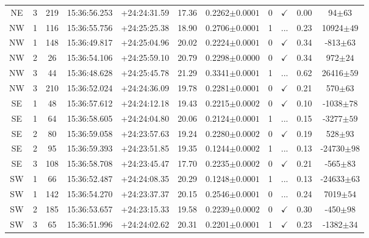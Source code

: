 \begin{table*}
\begin{tabular}{ccccccccccc}
		NE & 3 & 219 & 15:36:56.253 & +24:24:31.59 & 17.36 & 0.2262$\pm{0.0001}$ & 0 & $\checkmark$ & 0.00 & 94$\pm{63}$ \\
		NW & 1 & 116 & 15:36:55.756 & +24:25:25.38 & 18.90 & 0.2706$\pm{0.0001}$ & 1 & ... & 0.23 & 10924$\pm{49}$ \\
		NW & 1 & 148 & 15:36:49.817 & +24:25:04.96 & 20.02 & 0.2224$\pm{0.0001}$ & 0 & $\checkmark$ & 0.34 & -813$\pm{63}$ \\
		NW & 2 & 26 & 15:36:54.106 & +24:25:59.10 & 20.79 & 0.2298$\pm{0.0000}$ & 0 & $\checkmark$ & 0.34 & 972$\pm{24}$ \\
		NW & 3 & 44 & 15:36:48.628 & +24:25:45.78 & 21.29 & 0.3341$\pm{0.0001}$ & 1 & ... & 0.62 & 26416$\pm{59}$ \\
		NW & 3 & 210 & 15:36:52.024 & +24:24:36.09 & 19.78 & 0.2281$\pm{0.0001}$ & 0 & $\checkmark$ & 0.21 & 570$\pm{63}$ \\
		SE & 1 & 48 & 15:36:57.612 & +24:24:12.18 & 19.43 & 0.2215$\pm{0.0002}$ & 0 & $\checkmark$ & 0.10 & -1038$\pm{78}$ \\
		SE & 1 & 64 & 15:36:58.605 & +24:24:04.80 & 20.06 & 0.2124$\pm{0.0001}$ & 1 & ... & 0.15 & -3277$\pm{59}$ \\
		SE & 2 & 80 & 15:36:59.058 & +24:23:57.63 & 19.24 & 0.2280$\pm{0.0002}$ & 0 & $\checkmark$ & 0.19 & 528$\pm{93}$ \\
		SE & 2 & 95 & 15:36:59.393 & +24:23:51.85 & 19.35 & 0.1244$\pm{0.0002}$ & 1 & ... & 0.13 & -24730$\pm{98}$ \\
		SE & 3 & 108 & 15:36:58.708 & +24:23:45.47 & 17.70 & 0.2235$\pm{0.0002}$ & 0 & $\checkmark$ & 0.21 & -565$\pm{83}$ \\
		SW & 1 & 66 & 15:36:52.487 & +24:24:08.35 & 20.29 & 0.1248$\pm{0.0001}$ & 1 & ... & 0.13 & -24633$\pm{63}$ \\
		SW & 1 & 142 & 15:36:54.270 & +24:23:37.37 & 20.15 & 0.2546$\pm{0.0001}$ & 0 & ... & 0.24 & 7019$\pm{54}$ \\
		SW & 2 & 185 & 15:36:53.657 & +24:23:15.33 & 19.58 & 0.2239$\pm{0.0002}$ & 0 & $\checkmark$ & 0.30 & -450$\pm{98}$ \\
		SW & 3 & 65 & 15:36:51.996 & +24:24:02.62 & 20.31 & 0.2201$\pm{0.0001}$ & 1 & $\checkmark$ & 0.23 & -1382$\pm{34}$ \\
		\hline
	\end{tabular}
	\label{tbl:c234p2+24p4}
\end{table*}

